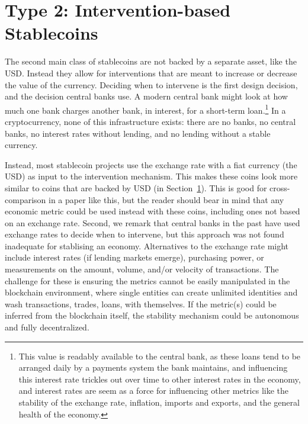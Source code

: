 \section{Type 2: Intervention-based Stablecoins}
\label{sec:t2}

The second main class of stablecoins are not backed by a separate asset, like the USD. Instead they allow for interventions that are meant to increase or decrease the value of the currency.  Deciding when to intervene is the first design decision, and the decision central banks use. A modern central bank might look at how much one bank charges another bank, in interest, for a short-term loan.\footnote{This value is readably available to the central bank, as these loans tend to be arranged daily by a payments system the bank maintains, and influencing this interest rate trickles out over time to other interest rates in the economy, and interest rates are seem as a force for influencing other metrics like the stability of the exchange rate, inflation, imports and exports, and the general health of the economy.} In a cryptocurrency, none of this infrastructure exists: there are no banks, no central banks, no interest rates without lending, and no lending without a stable currency.

Instead, most stablecoin projects use the exchange rate with a fiat currency (\eg the USD) as input to the intervention mechanism. This makes these coins look more similar to coins that are backed by USD (in Section~\ref{sec:t2}). This is good for cross-comparison in a paper like this, but the reader should bear in mind that any economic metric could be used instead with these coins, including ones not based on an exchange rate. Second, we remark that central banks in the past have used exchange rates to decide when to intervene, but this approach was not found inadequate for stablising an economy. Alternatives to the exchange rate might include interest rates (if lending markets emerge), purchasing power, or measurements on the amount, volume, and/or velocity of transactions. The challenge for these is ensuring the metrics cannot be easily manipulated in the blockchain environment, where single entities can create unlimited identities and wash transactions, trades, loans, \etc with themselves. If the metric(s) could be inferred from the blockchain itself, the stability mechanism could be autonomous and fully decentralized. 

